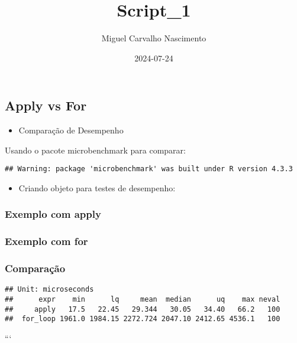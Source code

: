 \documentclass[
]{article}
\title{Script\_1}
\author{Miguel Carvalho Nascimento}
\date{2024-07-24}
\providecommand{\tightlist}{%
  \setlength{\itemsep}{0pt}\setlength{\parskip}{0pt}}
\begin{document}
\maketitle

\subsection{Apply vs For}\label{apply-vs-for}

\begin{itemize}
\tightlist
\item
  Comparação de Desempenho
\end{itemize}

Usando o pacote microbenchmark para comparar:

\begin{verbatim}
## Warning: package 'microbenchmark' was built under R version 4.3.3
\end{verbatim}

\begin{itemize}
\tightlist
\item
  Criando objeto para testes de desempenho:
\end{itemize}

\subsubsection{Exemplo com apply}\label{exemplo-com-apply}

\subsubsection{Exemplo com for}\label{exemplo-com-for}

\subsubsection{Comparação}\label{comparauxe7uxe3o}

\begin{verbatim}
## Unit: microseconds
##      expr    min      lq     mean  median      uq    max neval
##     apply   17.5   22.45   29.344   30.05   34.40   66.2   100
##  for_loop 1961.0 1984.15 2272.724 2047.10 2412.65 4536.1   100
\end{verbatim}

```
\end{document}
